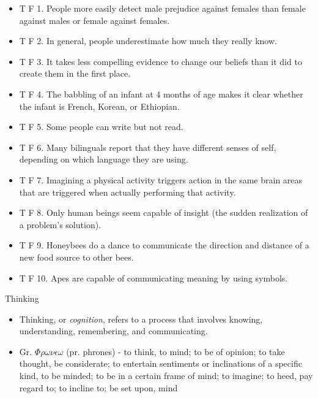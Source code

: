 \documentclass[
]{book}
\providecommand{\tightlist}{%
  \setlength{\itemsep}{0pt}\setlength{\parskip}{0pt}}
\begin{document}
\begin{reflect}
\begin{itemize}
\tightlist
\item
  T F 1. People more easily detect male prejudice against females than female against males or female against females.\\
\item
  T F 2. In general, people underestimate how much they really know.\\
\item
  T F 3. It takes less compelling evidence to change our beliefs than it did to create them in the first place.\\
\item
  T F 4. The babbling of an infant at 4 months of age makes it clear whether the infant is French, Korean, or Ethiopian.\\
\item
  T F 5. Some people can write but not read.\\
\item
  T F 6. Many bilinguals report that they have different senses of self, depending on which language they are using.\\
\item
  T F 7. Imagining a physical activity triggers action in the same brain areas that are triggered when actually performing that activity.\\
\item
  T F 8. Only human beings seem capable of insight (the sudden realization of a problem's solution).\\
\item
  T F 9. Honeybees do a dance to communicate the direction and distance of a new food source to other bees.\\
\item
  T F 10. Apes are capable of communicating meaning by using symbols.
\end{itemize}

Thinking

\begin{itemize}
\tightlist
\item
  Thinking, or \emph{cognition}, refers to a process that involves knowing, understanding, remembering, and communicating.\\
\item
  Gr. \(\Phi\rho\omega\nu\epsilon\omega\) (pr. phrones) - to think, to mind; to be of opinion; to take thought, be considerate; to entertain sentiments or inclinations of a specific kind, to be minded; to be in a certain frame of mind; to imagine; to heed, pay regard to; to incline to; be set upon, mind
\end{itemize}


\end{reflect}
\end{document}
